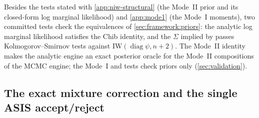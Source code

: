 Besides the tests stated with \cref{app:niw-structural} (the Mode~II prior and its closed-form log
marginal likelihood) and \cref{app:mode1} (the Mode~I moments), two committed tests check the
equivalences of \cref{sec:framework:priors}: the analytic log marginal likelihood satisfies the Chib
identity, and the $\Sigma$ implied by  passes Kolmogorov--Smirnov tests against
$\mathrm{IW}(\operatorname{diag}\psi, n+2)$. %
The Mode~II identity makes the analytic engine an exact posterior oracle for the Mode~II
 compositions of the MCMC engine; the Mode~I and  tests check
priors only (\cref{sec:validation}). %

\subsection{The exact mixture correction and the single ASIS accept/reject}\label{app:exact-sv}

